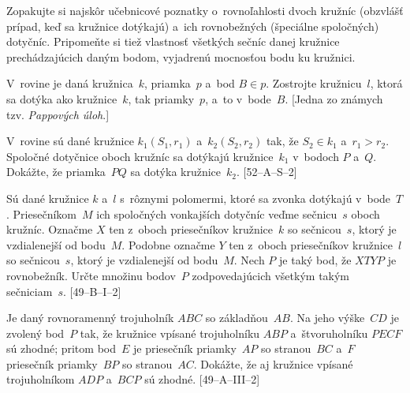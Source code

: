 {
{\everypar{}%
Zopakujte si najskôr učebnicové poznatky o~rovnoľahlosti dvoch
kružníc (obzvlášť prípad, keď sa kružnice dotýkajú)
a~ich rovnobežných (špeciálne spoločných) dotyčníc. Pripomeňte si
tiež vlastnosť všetkých sečníc danej kružnice prechádzajúcich daným bodom,
vyjadrenú mocnosťou bodu ku kružnici.
\par}
V~rovine je daná kružnica~$k$, priamka~$p$ a~bod $B\in p$.
Zostrojte kružnicu~$l$, ktorá sa dotýka ako kružnice~$k$, tak
priamky~$p$, a~to v~bode~$B$. [Jedna zo známych
tzv. {\it Pappových úloh}.]

\D%
V~rovine sú dané kružnice $k_1(S_1,r_1)$ a~$k_2(S_2,r_2)$ tak,
že $S_2\in k_1$ a~$r_1>r_2$. Spoločné dotyčnice oboch kružníc sa
dotýkajú kružnice~$k_1$ v~bodoch $P$ a~$Q$. Dokážte, že priamka~$PQ$
sa dotýka kružnice~$k_2$. [52--A--S--2]

Sú dané kružnice $k$ a~$l$ s~rôznymi polomermi, ktoré sa zvonka
dotýkajú v~bode~$T$. Priesečníkom~$M$ ich spoločných vonkajších
dotyčníc veďme sečnicu~$s$ oboch kružníc. Označme $X$ ten
z~oboch priesečníkov kružnice~$k$ so sečnicou~$s$, ktorý je vzdialenejší
od bodu~$M$. Podobne označme $Y$ ten z~oboch priesečníkov kružnice~$l$
so sečnicou~$s$, ktorý je vzdialenejší od bodu~$M$. Nech $P$ je
taký bod, že $XTY\!P$ je rovnobežník. Určte množinu bodov~$P$
zodpovedajúcich všetkým takým sečniciam~$s$. [49--B--I--2]

Je daný rovnoramenný trojuholník $ABC$ so základňou~$AB$. Na jeho výške~$CD$
je zvolený bod~$P$ tak, že kružnice vpísané trojuholníku $ABP$
a~štvoruholníku $PECF$ sú zhodné; pritom bod~$E$ je
priesečník priamky~$AP$ so stranou~$BC$ a~$F$ priesečník priamky~$BP$
so stranou~$AC$. Dokážte, že aj kružnice vpísané trojuholníkom $ADP$
a~$BCP$ sú zhodné. [49--A--III--2]
}


